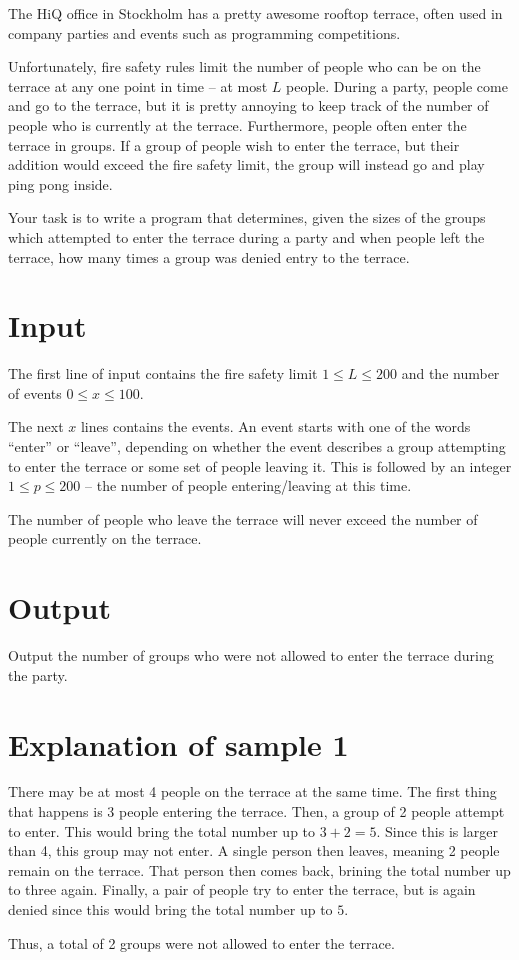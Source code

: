 The HiQ office in Stockholm has a pretty awesome rooftop terrace, often used in company parties and events such as programming competitions.

Unfortunately, fire safety rules limit the number of people who can be on the terrace at any one point in time -- at most $L$ people.
During a party, people come and go to the terrace, but it is pretty annoying to keep track of the number of people who is currently at the terrace. Furthermore, people often enter the terrace in groups. If a group of people wish to enter the terrace, but their addition would exceed the fire safety limit, the group will instead go and play ping pong inside. 

Your task is to write a program that determines, given the sizes of the groups which attempted to enter the terrace during a party and when people left the terrace, how many times a group was denied entry to the terrace.

\section*{Input}
The first line of input contains the fire safety limit $1 \le L \le 200$ and the number of events $0 \le x \le 100$.

The next $x$ lines contains the events.
An event starts with one of the words ``enter'' or ``leave'', depending on whether the event describes a group attempting to enter the terrace or some set of people leaving it.
This is followed by an integer $1 \le p \le 200$ -- the number of people entering/leaving at this time.

The number of people who leave the terrace will never exceed the number of people currently on the terrace.

\section*{Output}
Output the number of groups who were not allowed to enter the terrace during the party.

\section*{Explanation of sample 1}
There may be at most 4 people on the terrace at the same time.
The first thing that happens is 3 people entering the terrace.
Then, a group of 2 people attempt to enter.
This would bring the total number up to $3 + 2 = 5$.
Since this is larger than 4, this group may not enter.
A single person then leaves, meaning 2 people remain on the terrace.
That person then comes back, brining the total number up to three again.
Finally, a pair of people try to enter the terrace, but is again denied since this would bring the total number up to $5$.

Thus, a total of 2 groups were not allowed to enter the terrace.
